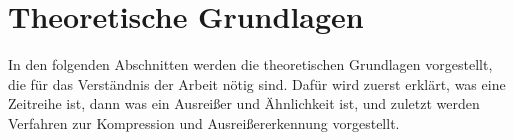 \chapter{Theoretische Grundlagen}\label{ch:theoretischegrundlagen}
In den folgenden Abschnitten werden die theoretischen Grundlagen vorgestellt, die für das Verständnis der Arbeit nötig sind. Dafür wird zuerst erklärt, was eine Zeitreihe ist, dann was ein Ausreißer und Ähnlichkeit ist, und zuletzt werden Verfahren zur Kompression und Ausreißererkennung vorgestellt.




